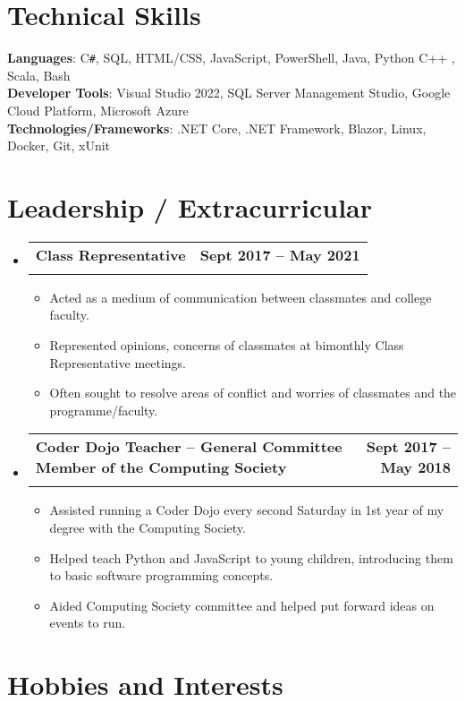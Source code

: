 \documentclass[letterpaper,11pt]{article}
\makeatletter
\newcommand{\resumeItem}[1]{
  \item\small{
    {#1 \vspace{-2pt}}
  }
}
\newcommand{\resumeSubheading}[4]{
  \vspace{-2pt}\item
    \begin{tabular*}{1.0\textwidth}[t]{l@{\extracolsep{\fill}}r}
      \textbf{#1} & \textbf{\small #2} \\
      \textit{\small#3} & \textit{\small #4} \\
    \end{tabular*}\vspace{-7pt}
}
\newcommand{\resumeSubHeadingListStart}{\begin{itemize}[leftmargin=0.0in, label={}]}
\newcommand{\resumeSubHeadingListEnd}{\end{itemize}}
\newcommand{\resumeItemListStart}{\begin{itemize}}
\newcommand{\resumeItemListEnd}{\end{itemize}\vspace{-5pt}}
\makeatother
\begin{document}
%
\section{Technical Skills}
\begin{itemize}[leftmargin=0.15in, label={}]
	\small{\item{
		\textbf{Languages}{: C\verb|#|, SQL, HTML/CSS, JavaScript, PowerShell, Java, Python  C++ , Scala, Bash} \\
		\textbf{Developer Tools}{: Visual Studio 2022, SQL Server Management Studio, Google Cloud Platform, Microsoft Azure} \\
		\textbf{Technologies/Frameworks}{: .NET Core, .NET Framework, Blazor, Linux, Docker, Git, xUnit} \\
	}}
\end{itemize}
\vspace{-13pt}


\section{Leadership / Extracurricular}
\resumeSubHeadingListStart
\resumeSubheading{Class Representative}{Sept 2017 -- May 2021}{}{}
\vspace{-15pt}
\resumeItemListStart
\resumeItem{Acted as a medium of communication between classmates and college faculty.}
\resumeItem{Represented opinions, concerns of classmates at bimonthly Class Representative meetings.}
\resumeItem{Often sought to resolve areas of conflict and worries of classmates and the programme/faculty. }
\resumeItemListEnd
\resumeSubHeadingListEnd
\vspace{-15pt}
\resumeSubHeadingListStart
\resumeSubheading{Coder Dojo Teacher -- General Committee Member of the Computing Society}{Sept 2017 -- May 2018}{}{}
\vspace{-15pt}
\resumeItemListStart
\resumeItem{Assisted running a Coder Dojo every second Saturday in 1st year of my degree with the Computing Society.}
\resumeItem{Helped teach Python and JavaScript to young children, introducing them to basic software programming concepts.}
\resumeItem{Aided Computing Society committee and helped put forward ideas on events to run.}
\resumeItemListEnd
       
\resumeSubHeadingListEnd


\section{Hobbies and Interests}
\end{document}
